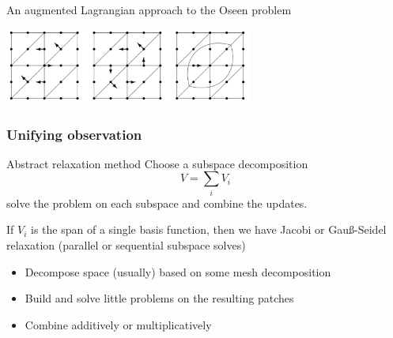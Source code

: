 \documentclass[presentation,aspectratio=43, 10pt]{beamer}
\begin{document}
\begin{frame}[t]
\begin{onlyenv}
\begin{block}{An augmented Lagrangian approach to the Oseen problem}
      \begin{center}
        \includegraphics[height=2.5cm]{benzi}
      \end{center}
      \begin{flushright}
        \textcite{Benzi:2006} \hspace{4em}
      \end{flushright}
    \end{block}
  \end{onlyenv}
\end{frame}

\begin{frame}
  \frametitle{Unifying observation}
  \begin{block}{Abstract relaxation method}
    Choose a subspace decomposition
    \begin{equation*}
      V = \sum_i V_i
    \end{equation*}
    solve the problem on each subspace and combine the updates.
  \end{block}
  \begin{example}
    If $V_i$ is the span of a single basis function, then we have
    Jacobi or Gau\ss-Seidel relaxation (parallel or sequential
    subspace solves)
  \end{example}
  \begin{itemize}
  \item Decompose space (usually) based on some mesh decomposition
  \item Build and solve little problems on the resulting patches
  \item Combine additively or multiplicatively
  \end{itemize}
\end{frame}
\end{document}
